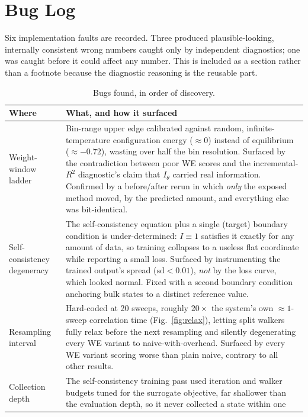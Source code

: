 \documentclass[11pt,a4paper]{article}
\begin{document}
\section{Bug Log}

Six implementation faults are recorded. Three produced plausible-looking, internally consistent
wrong numbers caught only by independent diagnostics; one was caught before it could affect any
number. This is included as a section rather than a footnote because the diagnostic reasoning is
the reusable part.

\begin{table}[H]\centering\small
\caption{Bugs found, in order of discovery.}
\begin{tabular}{p{2.5cm}p{11.6cm}}\toprule
\textbf{Where} & \textbf{What, and how it surfaced}\\\midrule
Weight-window ladder &
Bin-range upper edge calibrated against random, infinite-temperature configuration energy
($\approx0$) instead of equilibrium ($\approx-0.72$), wasting over half the bin resolution.
Surfaced by the contradiction between poor WE scores and the incremental-$R^2$ diagnostic's
claim that $I_\theta$ carried real information. Confirmed by a before/after rerun in which
\emph{only} the exposed method moved, by the predicted amount, and everything else was
bit-identical.\\\midrule
Self-consistency degeneracy &
The self-consistency equation plus a single (target) boundary condition is under-determined:
$I\equiv1$ satisfies it exactly for any amount of data, so training collapses to a useless flat
coordinate while reporting a small loss. Surfaced by instrumenting the trained output's spread
($\mathrm{sd}<0.01$), \emph{not} by the loss curve, which looked normal. Fixed with a second
boundary condition anchoring bulk states to a distinct reference value.\\\midrule
Resampling interval &
Hard-coded at 20 sweeps, roughly $20\times$ the system's own $\approx1$-sweep correlation time
(Fig.~\ref{fig:relax}), letting split walkers fully relax before the next resampling and silently
degenerating every WE variant to naive-with-overhead. Surfaced by every WE variant scoring worse
than plain naive, contrary to all other results.\\\midrule
Collection depth &
The self-consistency training pass used iteration and walker budgets tuned for the surrogate
objective, far shallower than the evaluation depth, so it never collected a state within one

\end{tabular}
\end{table}
\end{document}
